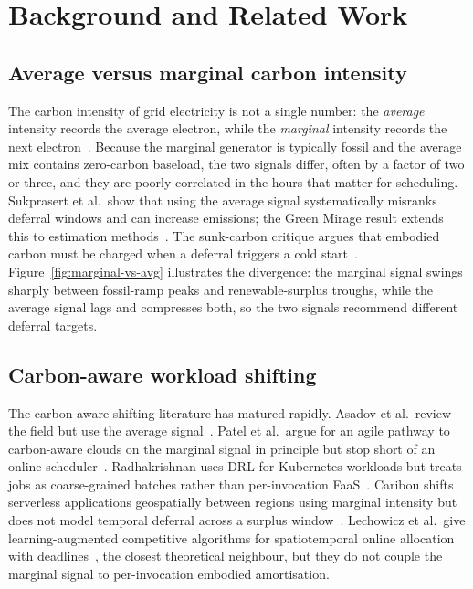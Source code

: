 \section{Background and Related Work}
\label{sec:background}

\subsection{Average versus marginal carbon intensity}
The carbon intensity of grid electricity is not a single number: the \emph{average} intensity records the average electron, while the \emph{marginal} intensity records the next electron~\cite{sukprasert2024implications}. Because the marginal generator is typically fossil and the average mix contains zero-carbon baseload, the two signals differ, often by a factor of two or three, and they are poorly correlated in the hours that matter for scheduling. Sukprasert et al.\ show that using the average signal systematically misranks deferral windows and can increase emissions; the Green Mirage result extends this to estimation methods~\cite{maji2024green}. The sunk-carbon critique argues that embodied carbon must be charged when a deferral triggers a cold start~\cite{bashir2024sunk}. Figure~\ref{fig:marginal-vs-avg} illustrates the divergence: the marginal signal swings sharply between fossil-ramp peaks and renewable-surplus troughs, while the average signal lags and compresses both, so the two signals recommend different deferral targets.



\subsection{Carbon-aware workload shifting}
The carbon-aware shifting literature has matured rapidly. Asadov et al.\ review the field but use the average signal~\cite{asadov2025carbonaware}. Patel et al.\ argue for an agile pathway to carbon-aware clouds on the marginal signal in principle but stop short of an online scheduler~\cite{patel2024agile}. Radhakrishnan uses DRL for Kubernetes workloads but treats jobs as coarse-grained batches rather than per-invocation FaaS~\cite{radhakrishnan2024carbonaware}. Caribou shifts serverless applications geospatially between regions using marginal intensity but does not model temporal deferral across a surplus window~\cite{gsteiger2024caribou}. Lechowicz et al.\ give learning-augmented competitive algorithms for spatiotemporal online allocation with deadlines~\cite{lechowicz2024learningaugmented}, the closest theoretical neighbour, but they do not couple the marginal signal to per-invocation embodied amortisation.

